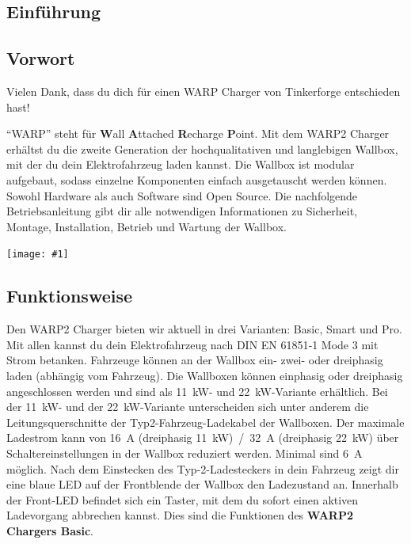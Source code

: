 \documentclass[a4paper,10pt]{article}
\newcommand{\gfx}[1]{\texttt{[image: \#1]}}
\begin{document}
\begin{multicols*}{2}
	\tableofcontents \section{Einführung}
	\subsection{Vorwort} Vielen Dank, dass du
	dich für einen WARP Charger von Tinkerforge entschieden hast!

	\enquote{WARP} steht
	für \textbf{W}all \textbf{A}ttached
	\textbf{R}echarge \textbf{P}oint. Mit dem WARP2 Charger
	erhältst du die zweite Generation der hochqualitativen und langlebigen Wallbox, 
	mit der du dein Elektrofahrzeug laden kannst. 
	Die Wallbox ist modular aufgebaut, sodass
	einzelne Komponenten einfach ausgetauscht werden können. Sowohl Hardware als
	auch Software sind Open Source. Die nachfolgende Betriebsanleitung gibt dir
	alle notwendigen Informationen zu Sicherheit, Montage, Installation, Betrieb
	und Wartung der Wallbox.

	\vfill
	\gfx{./img_warp2/resized/type_2_connector_ready}

	\subsection{Funktionsweise}
	Den WARP2 Charger bieten wir aktuell in drei Varianten: Basic, Smart und Pro.
	Mit allen kannst du dein Elektrofahrzeug nach DIN EN 61851‐1 Mode 3 mit Strom
	betanken. Fahrzeuge können an der Wallbox ein- zwei- oder dreiphasig laden
	(abhängig vom Fahrzeug). Die Wallboxen können einphasig oder dreiphasig
	angeschlossen werden und sind als \SI{11}{\kilo\watt}- und
	\SI{22}{\kilo\watt}-Variante erhältlich. Bei der \SI{11}{\kilo\watt}- und
	der \SI{22}{\kilo\watt}-Variante unterscheiden sich unter anderem die
	Leitungsquerschnitte der Typ2-Fahrzeug-Ladekabel der Wallboxen. Der maximale Ladestrom
	kann von \SI{16}{\ampere}
	(dreiphasig \SI{11}{\kilo\watt})~/~\SI{32}{\ampere} (dreiphasig \SI{22}{\kilo\watt}) über
	Schaltereinstellungen in der Wallbox reduziert werden. Minimal sind
	\SI{6}{\ampere} möglich. Nach dem Einstecken des Typ-2-Ladesteckers in
	dein Fahrzeug zeigt dir eine blaue LED auf der Frontblende der Wallbox den
	Ladezustand an. Innerhalb der Front-LED befindet sich ein Taster, mit dem
	du sofort einen aktiven Ladevorgang abbrechen kannst. Dies sind die
	Funktionen des \textbf{WARP2 Chargers Basic}.


\end{multicols*}
\end{document}
